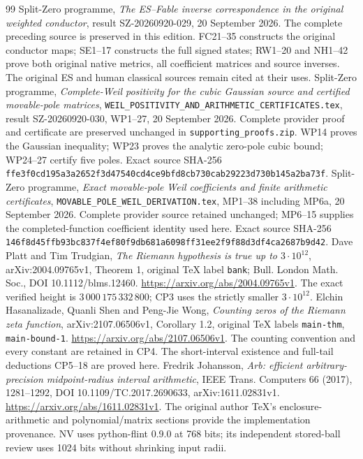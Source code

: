 \documentclass[11pt]{article}
\begin{document}
\begin{thebibliography}{99}
 Split-Zero programme,
\emph{The ES--Fable inverse correspondence in the original weighted conductor},
result SZ-20260920-029, 20 September 2026. The complete preceding source is
preserved in this edition. FC21--35 constructs the original conductor maps;
SE1--17 constructs the full signed states; RW1--20 and NH1--42 prove both
original native metrics, all coefficient matrices and source inverses.
The original ES and human classical sources remain cited at their uses.
 Split-Zero programme,
\emph{Complete-Weil positivity for the cubic Gaussian source and certified
movable-pole matrices},
\texttt{WEIL\_POSITIVITY\_AND\_ARITHMETIC\_CERTIFICATES.tex},
result SZ-20260920-030, WP1--27, 20 September 2026.
Complete provider proof and certificate are preserved unchanged in
\texttt{supporting\_proofs.zip}. WP14 proves the Gaussian inequality;
WP23 proves the analytic zero-pole cubic bound; WP24--27 certify five poles.
Exact source SHA-256
\texttt{ffe3f0cd195a3a2652f3d47540cd4ce9bfd8cb730cab29223d730b145a2ba73f}.
 Split-Zero programme,
\emph{Exact movable-pole Weil coefficients and finite arithmetic certificates},
\texttt{MOVABLE\_POLE\_WEIL\_DERIVATION.tex}, MP1--38 including MP6a,
20 September 2026. Complete provider source retained unchanged;
MP6--15 supplies the completed-function coefficient identity used here.
Exact source SHA-256
\texttt{146f8d45ffb93bc837f4ef80f9db681a6098ff31ee2f9f88d3df4ca2687b9d42}.
 Dave Platt and Tim Trudgian,
\emph{The Riemann hypothesis is true up to $3\cdot10^{12}$},
arXiv:2004.09765v1, Theorem 1, original TeX label \texttt{bank};
Bull. London Math. Soc., DOI 10.1112/blms.12460.
\url{https://arxiv.org/abs/2004.09765v1}.
The exact verified height is $3\,000\,175\,332\,800$;
CP3 uses the strictly smaller $3\cdot10^{12}$.
 Elchin Hasanalizade, Quanli Shen and Peng-Jie Wong,
\emph{Counting zeros of the Riemann zeta function},
arXiv:2107.06506v1, Corollary 1.2,
original TeX labels \texttt{main-thm}, \texttt{main-bound-1}.
\url{https://arxiv.org/abs/2107.06506v1}.
The counting convention and every constant are retained in CP4.
The short-interval existence and full-tail deductions CP5--18 are proved here.
 Fredrik Johansson,
\emph{Arb: efficient arbitrary-precision midpoint-radius interval arithmetic},
IEEE Trans. Computers 66 (2017), 1281--1292,
DOI 10.1109/TC.2017.2690633, arXiv:1611.02831v1.
\url{https://arxiv.org/abs/1611.02831v1}.
The original author TeX's enclosure-arithmetic and polynomial/matrix sections
provide the implementation provenance. NV uses python-flint 0.9.0 at 768 bits;
its independent stored-ball review uses 1024 bits without shrinking input radii.



\end{thebibliography}
\end{document}
